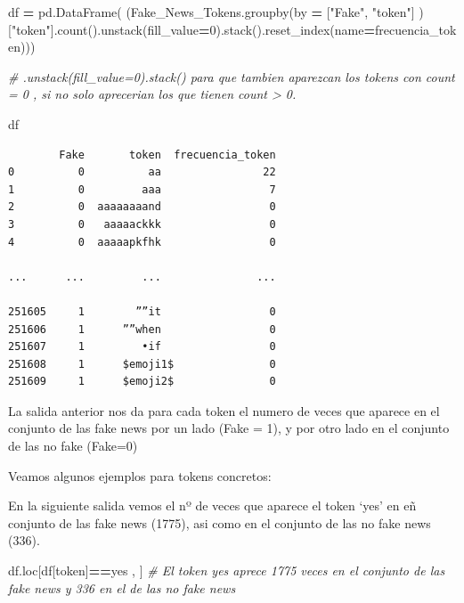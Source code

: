 \documentclass[
  11pt,
  a4paper,
]{article}
\newenvironment{Shaded}{\begin{snugshade}}{\end{snugshade}}
\newcommand{\CommentTok}[1]{\textcolor[rgb]{0.56,0.35,0.01}{\textit{#1}}}
\newcommand{\DecValTok}[1]{\textcolor[rgb]{0.00,0.00,0.81}{#1}}
\newcommand{\NormalTok}[1]{#1}
\newcommand{\OperatorTok}[1]{\textcolor[rgb]{0.81,0.36,0.00}{\textbf{#1}}}
\newcommand{\StringTok}[1]{\textcolor[rgb]{0.31,0.60,0.02}{#1}}
\begin{document}
\begin{Shaded}
\begin{Highlighting}[]
\NormalTok{df }\OperatorTok{=}\NormalTok{ pd.DataFrame(  (Fake\_News\_Tokens.groupby(by }\OperatorTok{=}\NormalTok{ [}\StringTok{"Fake"}\NormalTok{, }\StringTok{"token"}\NormalTok{] )[}\StringTok{"token"}\NormalTok{].count().unstack(fill\_value}\OperatorTok{=}\DecValTok{0}\NormalTok{).stack().reset\_index(name}\OperatorTok{=}\StringTok{\textquotesingle{}frecuencia\_token\textquotesingle{}}\NormalTok{)))}

\CommentTok{\# .unstack(fill\_value=0).stack() para que tambien aparezcan los tokens con count = 0 , si no solo aprecerian los que tienen count \textgreater{} 0.}

\NormalTok{df}
\end{Highlighting}
\end{Shaded}

\begin{verbatim}
        Fake       token  frecuencia_token
0          0          aa                22
1          0         aaa                 7
2          0  aaaaaaaand                 0
3          0   aaaaackkk                 0
4          0  aaaaapkfhk                 0

...      ...         ...               ...

251605     1        ””it                 0
251606     1      ””when                 0
251607     1         •if                 0
251608     1      $emoji1$               0
251609     1      $emoji2$               0
\end{verbatim}

La salida anterior nos da para cada token el numero de veces que aparece
en el conjunto de las fake news por un lado (Fake = 1), y por otro lado
en el conjunto de las no fake (Fake=0)

Veamos algunos ejemplos para tokens concretos:

En la siguiente salida vemos el nº de veces que aparece el token `yes'
en eñ conjunto de las fake news (1775), asi como en el conjunto de las
no fake news (336).

\begin{Shaded}
\begin{Highlighting}[]
\NormalTok{df.loc[df[}\StringTok{\textquotesingle{}token\textquotesingle{}}\NormalTok{]}\OperatorTok{==}\StringTok{\textquotesingle{}yes\textquotesingle{}}\NormalTok{ , ] }\CommentTok{\# El token \textquotesingle{}yes\textquotesingle{} aprece 1775 veces en el conjunto de las fake news y 336 en el de las no fake news}
\end{Highlighting}
\end{Shaded}
\end{document}
